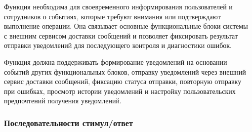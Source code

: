 \documentclass[12pt,a4paper]{article}
\begin{document}
	Функция необходима для своевременного информирования пользователей и сотрудников
	о событиях, которые требуют внимания или подтверждают выполнение операции.
	Она связывает основные функциональные блоки системы с внешним сервисом доставки
	сообщений и позволяет фиксировать результат отправки уведомлений для последующего
	контроля и диагностики ошибок.
	
	Функция должна поддерживать формирование уведомлений на основании событий
	других функциональных блоков, отправку уведомлений через внешний сервис
	доставки сообщений, фиксацию статуса отправки, повторную отправку при ошибках,
	просмотр истории уведомлений и настройку пользовательских предпочтений
	получения уведомлений.
	
	\subsubsection{Последовательности стимул/ответ}
	
\end{document}
